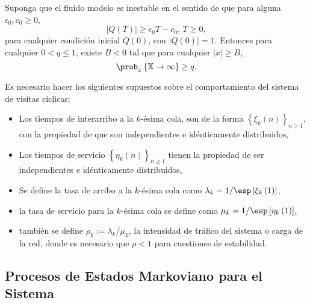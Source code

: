 \begin{Teo}\label{Tma2.2.Down}
Suponga que el fluido modelo es inestable en el sentido de que
para alguna $\epsilon_{0},c_{0}\geq0$,
\begin{equation}\label{Eq.Inestability}
|Q\left(T\right)|\geq\epsilon_{0}T-c_{0}\textrm{,   }T\geq0,
\end{equation}
para cualquier condici\'on inicial $Q\left(0\right)$, con
$|Q\left(0\right)|=1$. Entonces para cualquier $0<q\leq1$, existe
$B<0$ tal que para cualquier $|x|\geq B$,
\begin{equation}
\prob_{x}\left\{\mathbb{X}\rightarrow\infty\right\}\geq q.
\end{equation}
\end{Teo}



Es necesario hacer los siguientes supuestos sobre el
comportamiento del sistema de visitas c\'iclicas:
\begin{itemize}
\item Los tiempos de interarribo a la $k$-\'esima cola, son de la
forma $\left\{\xi_{k}\left(n\right)\right\}_{n\geq1}$, con la
propiedad de que son independientes e id{\'e}nticamente
distribuidos,
\item Los tiempos de servicio
$\left\{\eta_{k}\left(n\right)\right\}_{n\geq1}$ tienen la
propiedad de ser independientes e id{\'e}nticamente distribuidos,
\item Se define la tasa de arribo a la $k$-{\'e}sima cola como
$\lambda_{k}=1/\esp\left[\xi_{k}\left(1\right)\right]$,
\item la tasa de servicio para la $k$-{\'e}sima cola se define
como $\mu_{k}=1/\esp\left[\eta_{k}\left(1\right)\right]$,
\item tambi{\'e}n se define $\rho_{k}:=\lambda_{k}/\mu_{k}$, la
intensidad de tr\'afico del sistema o carga de la red, donde es
necesario que $\rho<1$ para cuestiones de estabilidad.
\end{itemize}



\subsection{Procesos de Estados Markoviano para el Sistema}

